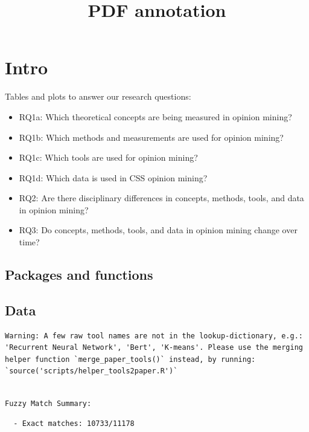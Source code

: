 \documentclass[
  letterpaper,
  DIV=11,
  numbers=noendperiod]{scrartcl}
\title{PDF annotation}
\author{}
\date{}
\providecommand{\tightlist}{%
  \setlength{\itemsep}{0pt}\setlength{\parskip}{0pt}}
\begin{document}
\maketitle


\section{Intro}\label{intro}

Tables and plots to answer our research questions:

\begin{itemize}
\tightlist
\item
  RQ1a: Which theoretical concepts are being measured in opinion mining?
\item
  RQ1b: Which methods and measurements are used for opinion mining?
\item
  RQ1c: Which tools are used for opinion mining?
\item
  RQ1d: Which data is used in CSS opinion mining?
\item
  RQ2: Are there disciplinary differences in concepts, methods, tools,
  and data in opinion mining?
\item
  RQ3: Do concepts, methods, tools, and data in opinion mining change
  over time?
\end{itemize}

\subsection{Packages and functions}\label{packages-and-functions}

\subsection{Data}\label{data}

\begin{verbatim}
Warning: A few raw tool names are not in the lookup-dictionary, e.g.: 'Recurrent Neural Network', 'Bert', 'K-means'. Please use the merging helper function `merge_paper_tools()` instead, by running: 
`source('scripts/helper_tools2paper.R')`
\end{verbatim}

\begin{verbatim}

Fuzzy Match Summary:
\end{verbatim}

\begin{verbatim}
  - Exact matches: 10733/11178
\end{verbatim}
\end{document}
